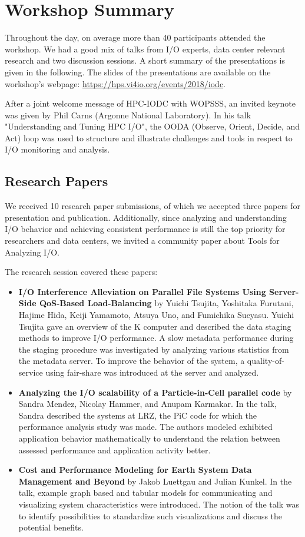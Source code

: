 \documentclass{llncs}
\begin{document}
\section{Workshop Summary}
\label{sec:summary}

Throughout the day, on average more than 40 participants attended the workshop.
We had a good mix of talks from I/O experts, data center relevant research and  two discussion sessions.
A short summary of the presentations is given in the following.
The slides of the presentations are available on the workshop's webpage:
\url{https://hps.vi4io.org/events/2018/iodc}.

After a joint welcome message of HPC-IODC with WOPSSS, an invited keynote was given by Phil Carns (Argonne National Laboratory).
In his talk "Understanding and Tuning HPC I/O", the OODA (Observe, Orient, Decide, and Act) loop was used to structure and illustrate challenges and tools in respect to I/O monitoring and analysis.


\subsection{Research Papers}

We received 10 research paper submissions, of which we accepted three papers for presentation and publication.
Additionally, since analyzing and understanding I/O behavior and achieving consistent performance is still the top priority for researchers and data centers, we invited a community paper about Tools for Analyzing I/O.

The research session covered these papers:
\begin{itemize}
\item \textbf{I/O Interference Alleviation on Parallel File Systems Using Server-Side QoS-Based Load-Balancing} by Yuichi Tsujita, Yoshitaka Furutani, Hajime Hida, Keiji Yamamoto, Atsuya Uno, and Fumichika Sueyasu.
Yuichi Tsujita gave an overview of the K computer and described the data staging methods to improve I/O performance.
A slow metadata performance during the staging procedure was investigated by analyzing various statistics from the metadata server.
To improve the behavior of the system, a quality-of-service using fair-share was introduced at the server and analyzed.


\item \textbf{Analyzing the I/O scalability of a Particle-in-Cell parallel code} by
Sandra Mendez, Nicolay Hammer, and Anupam Karmakar.
In the talk, Sandra described the systems at LRZ, the PiC code for which the performance analysis study was made.
The authors modeled exhibited application behavior mathematically to understand the relation between assessed performance and application activity better.

\item \textbf{Cost and Performance Modeling for Earth System Data Management and Beyond} by Jakob Luettgau and Julian Kunkel.
In the talk, example graph based and tabular models for communicating and visualizing system characteristics were introduced.
The notion of the talk was to identify possibilities to standardize such visualizations and discuss the potential benefits.
\end{itemize}
\end{document}
